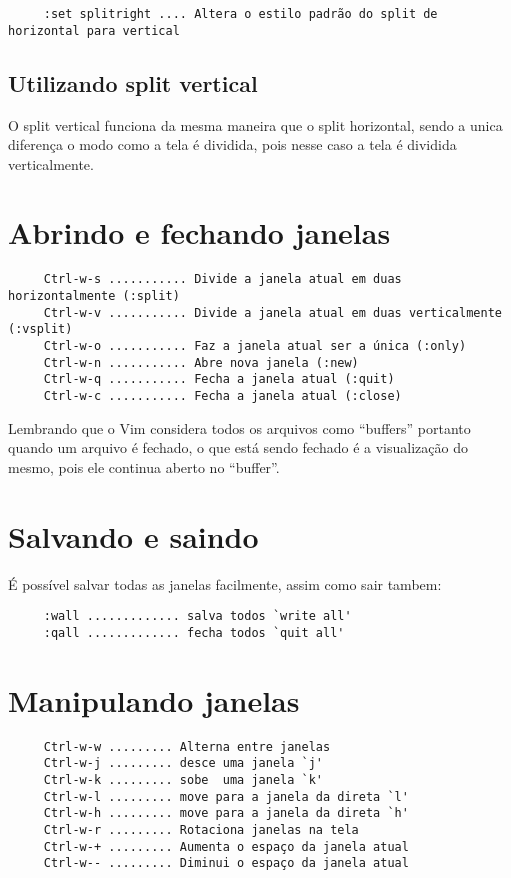 \begin{verbatim}
     :set splitright .... Altera o estilo padrão do split de horizontal para vertical
\end{verbatim}


\subsection{Utilizando split vertical}

O split vertical funciona da mesma maneira que o split horizontal,
sendo a unica diferença o modo como a tela é dividida, pois nesse
caso a tela é dividida verticalmente.


\section{Abrindo e fechando janelas }

\begin{verbatim}
     Ctrl-w-s ........... Divide a janela atual em duas horizontalmente (:split)
     Ctrl-w-v ........... Divide a janela atual em duas verticalmente (:vsplit)
     Ctrl-w-o ........... Faz a janela atual ser a única (:only)
     Ctrl-w-n ........... Abre nova janela (:new)
     Ctrl-w-q ........... Fecha a janela atual (:quit)
     Ctrl-w-c ........... Fecha a janela atual (:close)
\end{verbatim}

{\Large {}} Lembrando que o Vim considera todos os arquivos como ``buffers''
portanto quando um arquivo é fechado, o que está sendo fechado é a visualização
do mesmo, pois ele continua aberto no ``buffer''.


\section{Salvando e saindo}
É possível salvar todas as janelas facilmente, assim como sair tambem:

\begin{verbatim}
     :wall ............. salva todos `write all'
     :qall ............. fecha todos `quit all'
\end{verbatim}


\section{Manipulando janelas }

\begin{verbatim}
     Ctrl-w-w ......... Alterna entre janelas
     Ctrl-w-j ......... desce uma janela `j'
     Ctrl-w-k ......... sobe  uma janela `k'
     Ctrl-w-l ......... move para a janela da direta `l'
     Ctrl-w-h ......... move para a janela da direta `h'
     Ctrl-w-r ......... Rotaciona janelas na tela
     Ctrl-w-+ ......... Aumenta o espaço da janela atual
     Ctrl-w-- ......... Diminui o espaço da janela atual
\end{verbatim}

